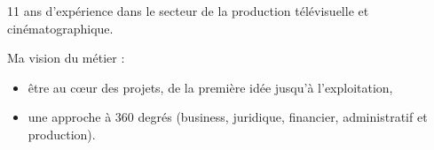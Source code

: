 
\begin{cvparagraph}

11 ans d'expérience dans le secteur de la production télévisuelle et cinématographique.

Ma vision du métier :
\begin{itemize}
  \item{être au cœur des projets, de la première idée jusqu'à l'exploitation,}
  \item{une approche à 360 degrés (business, juridique, financier, administratif et production).}
\end{itemize}
\end{cvparagraph}
